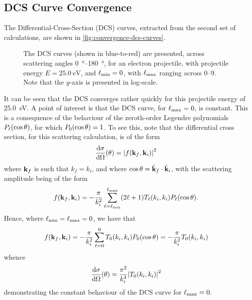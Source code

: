 \documentclass{article}
\begin{document}
\clearpage

\subsection{DCS Curve Convergence}
\label{sec:dcs-curve-conv}

The Differential-Cross-Section (DCS) curves, extracted from the second set
of calculations, are shown in \autoref{fig:convergence-dcs-curves}.

\begin{figure}[h]
  \begin{center}
    
  \end{center}
  \caption[Convergence of DCS Curves]{
    The DCS curves (shown in blue-to-red) are presented, across scattering
    angles \SIrange{0}{180}{\degree}, for an electron projectile, with
    projectile energy $E = \SI{25.0}{\eV}$, and $\ell_{\rm{min}} = 0$, with
    $\ell_{\rm{max}}$ ranging across \SIrange{0}{9}{}.
    Note that the $y$-axis is presented in log-scale.
  }
  \label{fig:convergence-dcs-curves}
\end{figure}

It can be seen that the DCS converges rather quickly for this projectile
energy of \SI{25.0}{\eV}.
A point of interest is that the DCS curve, for $\ell_{\rm{max}} = 0$, is
constant.
This is a consequence of the behaviour of the zeroth-order Legendre polynomials
$P_{\ell}(\cos\theta)$, for which $P_{0}(\cos\theta) = 1$.
To see this, note that the differential cross section, for this scattering
calculation, is of the form
\begin{equation*}
  \dv{\sigma}{\Omega}
  \lr{\theta}
  =
  \abs
  {
    f\lr{\vb{k}_{f}, \vb{k}_{i}}
  }^{2}
\end{equation*}
where $\vb{k}_{f}$ is such that $k_{f} = k_{i}$, and where
$\cos\theta = \hat{\vb{k}}_{f}\cdot\hat{\vb{k}}_{i}$, with the scattering
amplitude being of the form
\begin{equation*}
  f(\vb{k}_{f}, \vb{k}_{i})
  =
  -
  \dfrac{\pi}{k_{i}^{2}}
  \sum_{\ell = \ell_{\rm{min}}}^{\ell_{\rm{max}}}
  (2\ell + 1)
  T_{\ell}(k_{i}, k_{i})
  P_{\ell}(\cos\theta)
  .
\end{equation*}
Hence, where $\ell_{\rm{min}} = \ell_{\rm{max}} = 0$, we have that
\begin{equation*}
  f(\vb{k}_{f}, \vb{k}_{i})
  =
  -
  \dfrac{\pi}{k_{i}^{2}}
  \sum_{\ell = 0}^{0}
  T_{0}(k_{i}, k_{i})
  P_{0}(\cos\theta)
  =
  -
  \dfrac{\pi}{k_{i}^{2}}
  T_{0}(k_{i}, k_{i})
\end{equation*}
whence
\begin{equation*}
  \dv{\sigma}{\Omega}
  \lr{\theta}
  =
  \dfrac{\pi^{2}}{k_{i}^{4}}
  \abs
  {
    T_{0}\lr{k_{i}, k_{i}}
  }^{2}
\end{equation*}
demonstrating the constant behaviour of the DCS curve for $\ell_{\rm{max}} = 0$.
\end{document}
